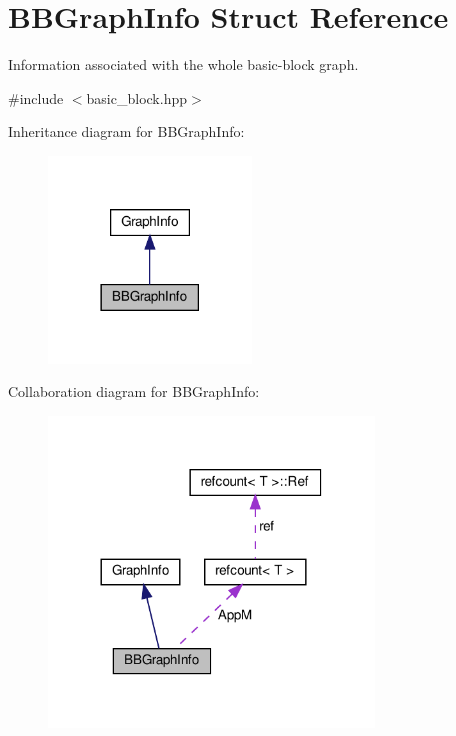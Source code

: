\hypertarget{structBBGraphInfo}{}\section{B\+B\+Graph\+Info Struct Reference}
\label{structBBGraphInfo}


Information associated with the whole basic-\/block graph.  




{\ttfamily \#include $<$basic\+\_\+block.\+hpp$>$}



Inheritance diagram for B\+B\+Graph\+Info\+:
\nopagebreak
\begin{figure}[H]
\begin{center}
\leavevmode
\includegraphics[width=153pt]{d2/d4f/structBBGraphInfo__inherit__graph}
\end{center}
\end{figure}


Collaboration diagram for B\+B\+Graph\+Info\+:
\nopagebreak
\begin{figure}[H]
\begin{center}
\leavevmode
\includegraphics[width=245pt]{d8/d42/structBBGraphInfo__coll__graph}
\end{center}
\end{figure}
